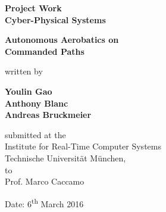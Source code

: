 \documentclass[11pt,a4paper]{scrartcl}		%
\begin{document}

\begin{titlepage}
	
	\singlespacing
	\begin{center}
	
		\quad
		\vspace{1cm}
	
		\Large{\textbf{Project Work\\Cyber-Physical Systems}}
	
		\vspace{1.5cm}
	
		\huge{\textbf{Autonomous Aerobatics on\\Commanded Paths}}
	
		\vspace{1.5cm}
	
		written by
		
		\vspace{1.5cm}
	
		\Large{\textbf{Youlin Gao\\Anthony Blanc\\Andreas Bruckmeier}}
	
		\vfill
		
		submitted at the\\
		Institute for Real-Time Computer Systems\\
		Technische Universität München,\\
		to\\
		Prof. Marco Caccamo

		\vspace{1cm}		
		
		Date: 6\textsuperscript{th} March 2016
	
	\end{center}
	
\end{titlepage}



\newpage
\tableofcontents	

\vspace{2.0cm}


\listoffigures
\end{document}
